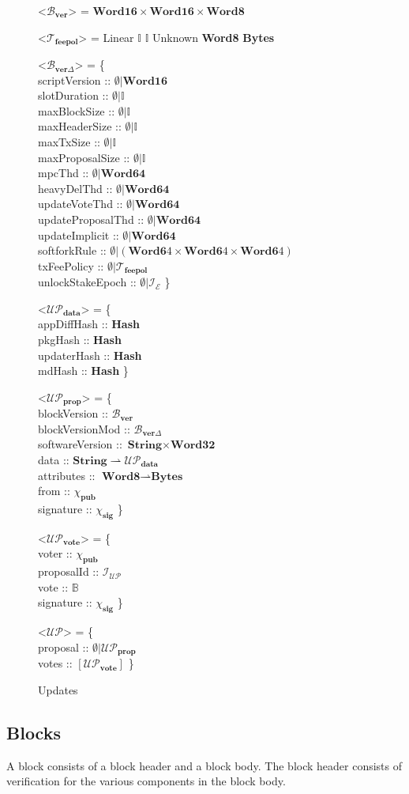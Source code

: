 \documentclass{article}
\def\fld{\\\llap{,\quad}}%
\newcommand{\rhu}{\rightharpoonup}
\newcommand{\lists}[1]{\left[{#1}\right]}
\newcommand{\maybe}[1]{\emptyset | {#1}}
\newcommand{\idsof}[1]{\mathcal{I}\!_#1}
\newcommand{\epochids}{\idsof{\mathcal{E}}}
\newcommand{\updids}{\idsof{\mathcal{UP}}}
\newcommand{\pubkey}{\chi_{\textbf{pub}}}
\newcommand{\signature}{\chi_{\textbf{sig}}}
\newcommand{\txs}{\mathcal{T}}
\newcommand{\txfeepol}{\txs_{\textbf{feepol}}}
\newcommand{\upd}{\mathcal{UP}}
\newcommand{\updprop}{\upd_{\textbf{prop}}}
\newcommand{\upddata}{\upd_{\textbf{data}}}
\newcommand{\updvote}{\upd_{\textbf{vote}}}
\newcommand{\blocks}{\mathcal{B}}
\newcommand{\blockver}{\blocks_{\textbf{ver}}}
\newcommand{\blockvermod}{\blocks_{\textbf{ver}\Delta}}
\newcommand{\hstype}[1]{\textbf{#1}}
\newcommand{\String}{\hstype{String}}
\newcommand{\Word}[1]{\hstype{Word#1}}
\newcommand{\hash}{\hstype{Hash}}
\newcommand{\Integer}{\mathbb{I}}
\newcommand{\Bool}{\mathbb{B}}
\newcommand{\Bytes}{\hstype{Bytes}}
\begin{document}
\begin{figure}[H]
  \begin{grammar}
    <$\blockver$> = $\Word{16}\times\Word{16}\times\Word{8}$

    <$\txfeepol$> = Linear $\Integer$ $\Integer$
    \alt Unknown \Word{8} \Bytes

    <$\blockvermod$> = \{
    \fld scriptVersion     :: $\maybe{\Word{16}}$
    \fld slotDuration      :: $\maybe{\Integer}$
    \fld maxBlockSize      :: $\maybe{\Integer}$
    \fld maxHeaderSize     :: $\maybe{\Integer}$
    \fld maxTxSize         :: $\maybe{\Integer}$
    \fld maxProposalSize   :: $\maybe{\Integer}$
    \fld mpcThd            :: $\maybe{\Word{64}}$
    \fld heavyDelThd       :: $\maybe{\Word{64}}$
    \fld updateVoteThd     :: $\maybe{\Word{64}}$
    \fld updateProposalThd :: $\maybe{\Word{64}}$
    \fld updateImplicit    :: $\maybe{\Word{64}}$
    \fld softforkRule      :: $\maybe{(\Word64\times\Word64\times\Word64)}$
    \fld txFeePolicy       :: $\maybe{\txfeepol}$
    \fld unlockStakeEpoch  :: $\maybe{\epochids}$
    \}

    <$\upddata$> = \{
    \fld appDiffHash :: \hash
    \fld pkgHash :: \hash
    \fld updaterHash :: \hash
    \fld mdHash :: \hash
    \}

    <$\updprop$> = \{
    \fld blockVersion :: $\blockver$
    \fld blockVersionMod :: $\blockvermod$
    \fld softwareVersion :: $\String \times \Word{32}$
    \fld data :: $\String \rhu \upddata$
    \fld attributes :: $\Word{8} \rhu \Bytes$
    \fld from :: $\pubkey$
    \fld signature :: $\signature$
    \}

    <$\updvote$> = \{
    \fld voter :: $\pubkey$
    \fld proposalId :: $\updids$
    \fld vote :: $\Bool$
    \fld signature :: $\signature$
    \}

    <$\upd$> = \{
    \fld proposal :: $\maybe{\updprop}$
    \fld votes :: $\lists{\updvote}$
    \}
  \end{grammar}
  \caption{Updates}
  \label{fig:updtypes}
\end{figure}
\subsection{Blocks}

A block consists of a block header and a block body. The block header consists
of verification for the various components in the block body.
\end{document}
